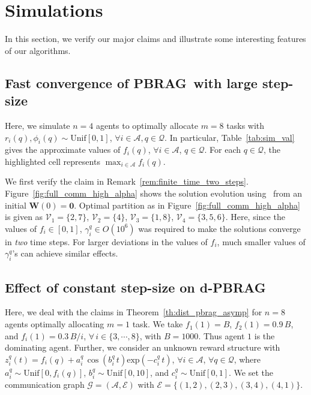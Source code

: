 \documentclass{IEEEtran}
\newcommand{\Mcal}[1]{\mathcal{#1}}
\newcommand{\Mc}[1]{\mathcal{#1}}
\newcommand{\bld}[1]{\mathbf{#1}}
\def \agt{\Mcal{A}}
\def \alloc{\Mcal{V}}
\def \edg{\Mcal{E}}
\def \exp{\mathrm{exp}}
\def \fseq{z}
\def \grph{\Mcal{G}}
\def \rf{r}
\def \tsk{\Mc{Q}}
\def \unif{\mathrm{Unif}}
\def \W{\bld{W}}
\def \zero{\bld{0}}
\def \dynacr{PBRAG}
\begin{document}
\section{Simulations} \label{sec:sims}

In this section, we verify our major claims and illustrate some
interesting features of our algorithms.

\subsection{Fast convergence of \dynacr\, with large step-size} \label{sec:sims_high_alpha}

Here, we simulate $n = 4$ agents to optimally allocate $m = 8$ tasks
with $\rf_i(q), \phi_i(q) \sim \unif[0,1]$,
$\forall i \in \agt, q \in \tsk$.  In particular,
Table~\ref{tab:sim_val} gives the approximate values of $f_i(q)$,
$\forall i \in \agt$, $q \in \tsk$. For each $q \in\tsk$, the
highlighted cell represents $\max_{i \in \agt} f_i(q)$.

We first verify the claim in Remark~\ref{rem:finite_time_two_steps}.
Figure~\ref{fig:full_comm_high_alpha} shows the solution evolution
using~ from an initial $\W(0) =
\zero$. Optimal partition as in Figure~\ref{fig:full_comm_high_alpha}
is given as $\alloc_1 =\{2,7\}$, $\alloc_2 =\{4\}$,
$\alloc_3 =\{1,8\}$, $\alloc_4 =\{3,5,6\}$.  Here, since the values of
$f_i \in [0,1]$, $\gamma^q_i \in O(10^6)$ was required to make the
solutions converge in \emph{two} time steps. For larger deviations in
the values of $f_i$, much smaller values of $\gamma^q_i$'s can achieve
similar effects.

\subsection{Effect of constant step-size on d-\dynacr}
\label{sec:sims_dist_const_ss}
Here, we deal with the claims in Theorem~\ref{th:dist_pbrag_asymp} for
$n = 8$ agents optimally allocating $m = 1$ task. We take
$f_1(1) = B$, $f_2(1) = 0.9\,B$, and $f_i(1) = 0.3 \, B/ i$,
$\forall \, i \in \{3,\cdots,8\}$, with $B = 1000$. Thus agent $1$ is
the dominating agent. Further, we consider an unknown reward structure
with $\fseq^q_i(t) = f_i(q) + a^q_i\,\cos(b^q_i\,t)\exp(-c^q_i\,t)$,
$\forall i \in \agt$, $\forall q \in \tsk$, where
$a^q_i \sim \unif[0,f_i(q)]$, $b^q_i \sim \unif[0,10]$, and
$c^q_i \sim \unif[0,1]$. We set the communication graph
$\grph = (\agt,\edg)$ with $\edg = \{(1,2),(2,3),(3,4),(4,1)\}$.
\end{document}

